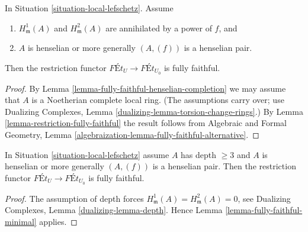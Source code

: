 \begin{lemma}
\label{lemma-fully-faithful-minimal}
\begin{reference}
\cite[Corollary 1.11]{Bhatt-local}
\end{reference}
In Situation \ref{situation-local-lefschetz}. Assume
\begin{enumerate}
\item $H^1_\mathfrak m(A)$ and $H^2_\mathfrak m(A)$ are
annihilated by a power of $f$, and
\item $A$ is henselian or more generally $(A, (f))$ is a henselian pair.
\end{enumerate}
Then the restriction functor
$\textit{F\'Et}_U \longrightarrow \textit{F\'Et}_{U_0}$
is fully faithful.
\end{lemma}

\begin{proof}
By Lemma \ref{lemma-fully-faithful-henselian-completion}
we may assume that $A$ is a Noetherian complete local ring.
(The assumptions carry over; use
Dualizing Complexes, Lemma \ref{dualizing-lemma-torsion-change-rings}.)
By Lemma \ref{lemma-restriction-fully-faithful}
the result follows from
Algebraic and Formal Geometry, Lemma
\ref{algebraization-lemma-fully-faithful-alternative}.
\end{proof}

\begin{lemma}
\label{lemma-fully-faithful}
In Situation \ref{situation-local-lefschetz} assume $A$ has depth $\geq 3$
and $A$ is henselian or more generally $(A, (f))$ is a henselian pair. Then
the restriction functor
$\textit{F\'Et}_U \to \textit{F\'Et}_{U_0}$
is fully faithful.
\end{lemma}

\begin{proof}
The assumption of depth forces
$H^1_\mathfrak m(A) = H^2_\mathfrak m(A) = 0$, see
Dualizing Complexes, Lemma \ref{dualizing-lemma-depth}.
Hence Lemma \ref{lemma-fully-faithful-minimal} applies.
\end{proof}



























